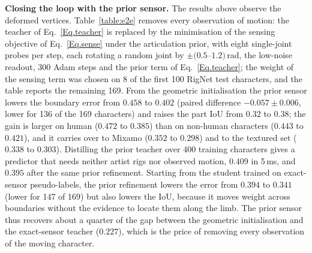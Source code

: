 \documentclass[lettersize,journal]{IEEEtran}
\newenvironment{revblock}{\par\color{red}}{\par}
\begin{document}
\begin{revblock}
\textbf{Closing the loop with the prior sensor.} The results above observe the deformed vertices.
Table~\ref{table:e2e} removes every observation of motion: the teacher of Eq.~\ref{Eq.teacher}
is replaced by the minimisation of the sensing objective of Eq.~\ref{Eq.sense} under the
articulation prior, with eight single-joint probes per step, each rotating a random joint by
$\pm(0.5$--$1.2)$\,rad, the low-noise readout, 300 Adam steps and the prior term of
Eq.~\ref{Eq.teacher}; the weight of the sensing term was chosen on 8 of the first 100 RigNet test
characters, and the table reports the remaining 169. From the geometric initialisation the prior
sensor lowers the boundary error from $0.458$ to $0.402$ (paired difference
$-0.057\pm0.006$, lower for 136 of the 169 characters) and raises the part IoU from $0.32$ to
$0.38$; the gain is larger on human ($0.472$ to $0.385$) than on non-human characters ($0.443$
to $0.421$), and it carries over to Mixamo ($0.352$ to $0.298$) and to the textured set ($0.338$
to $0.303$). Distilling the prior teacher over 400 training characters gives a predictor that
needs neither artist rigs nor observed motion, $0.409$ in 5\,ms, and $0.395$ after the same
prior refinement. Starting from the student trained on exact-sensor pseudo-labels, the prior
refinement lowers the error from $0.394$ to $0.341$ (lower for 147 of 169) but also lowers the
IoU, because it moves weight across boundaries without the evidence to locate them along the
limb. The prior sensor thus recovers about a quarter of the gap between the geometric
initialisation and the exact-sensor teacher ($0.227$), which is the price of removing every
observation of the moving character.
\end{revblock}
\end{document}
